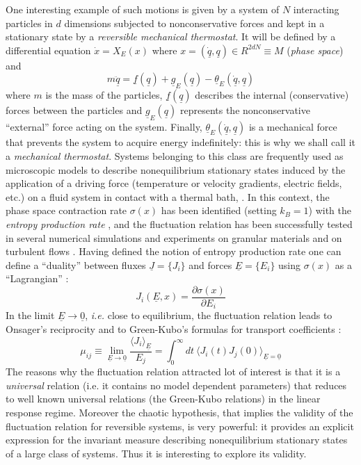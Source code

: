 \documentclass[pre,aps]{revtex4}
\newcommand{\beq}{\begin{equation}}
\newcommand{\eeq}{\end{equation}}
\newcommand{\ie}{i.e. }
\let\ul=\underline
\begin{document}
One interesting example of such motions is given by a system of 
$N$ interacting particles
in $d$ dimensions subjected to nonconservative forces and kept in a
stationary state by a {\it reversible mechanical thermostat}.
It will be defined by a differential equation $\dot x=X_E(x)$ where 
$x=(\dot{\ul q},\ul q) \in R^{2dN} \equiv M$ ({\it phase space})
and
\beq
\label{INTRO1}
m \ddot{\ul q} = \ul f(\ul q) + \ul g_E (\ul q) - \ul 
\theta_E (\dot{\ul q},\ul q)
\eeq
where $m$ is the mass of the particles, $\ul f(\ul q)$ describes 
the internal (conservative)
forces between the particles and $\ul g_E (\ul q)$ represents 
the nonconservative
``external'' force acting on the system. Finally, 
$\ul \theta_E (\dot{\ul q},\ul q)$ is a
mechanical force that prevents the system to acquire energy indefinitely: 
this is why we shall
call it a {\it mechanical thermostat}.
Systems belonging to this class are frequently 
used as microscopic models to describe
nonequilibrium stationary states induced by the application of a driving force
(temperature or velocity gradients, electric fields, etc.) on a
fluid system in contact with a thermal bath, \cite{Ru04}. 
In this context, the phase space contraction
rate $\sigma(x)$ has been identified (setting $k_B=1$) 
with the {\it entropy production rate} \cite{ECM93,Ga99,Ga04,Ru04},
and the fluctuation relation has been successfully tested in 
several numerical simulations
\cite{ECM93,BGG97,BCL98,BPV98,GP99,GRS04,ZRA04a} and
experiments on granular materials and on turbulent
flows \cite{CL98,GGK01,CGHLP03,FM04}.
Having defined the notion of entropy production rate one can 
define a ``duality'' between 
fluxes $\ul J = \{ J_i \}$ and forces $\ul E= \{ E_i \}$ using $\sigma(x)$ as a 
``Lagrangian'' \cite{Ga04}:
\beq
\label{Jdef}
J_i(\ul E,x) = \frac{\partial \sigma(x)}{\partial E_i}
\eeq
In the limit $\ul E \rightarrow \ul 0$, {\it i.e.} close to equilibrium, 
the fluctuation relation
leads to Onsager's reciprocity and to Green-Kubo's formulas for 
transport coefficients
\cite{GR97,Ga96a,Ga96b}:
\beq
\label{GK}
\mu_{ij} \equiv \lim_{\ul E \rightarrow \ul 0} \frac{\langle J_i 
\rangle_{\ul E}}{E_j} = 
\int_0^\infty dt \ \langle J_i(t) J_j(0) \rangle_{\ul E=\ul 0}
\eeq
The reasons why the fluctuation relation attracted lot of interest is that
it is a {\it universal} relation (\ie it contains no model dependent parameters)
that reduces to well known universal relations (the Green-Kubo relations) 
in the linear response regime.
Moreover the chaotic hypothesis, that implies the validity of the fluctuation
relation for reversible systems, is very powerful: it provides an explicit expression
for the invariant measure describing nonequilibrium stationary states of a large
class of systems. Thus it is interesting to explore its validity. 
\end{document}
